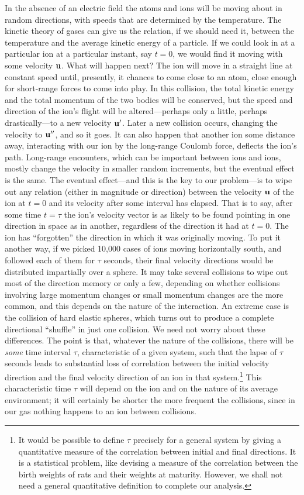 In the absence of an electric field the atoms and ions will be moving
about in random directions, with speeds that are determined by
the temperature. The kinetic theory of gases can give us the relation,
if we should need it, between the temperature and the average
kinetic energy of a particle. If we could look in at a particular ion
at a particular instant, say $t = 0$, we would find it moving with some
velocity $\mathbf{u}$. What will happen next? The ion will move in a straight
line at constant speed until, presently, it chances to come close to an
atom, close enough for short-range forces to come into play. In this
collision, the total kinetic energy and the total momentum of the two
bodies will be conserved, but the speed and direction of the ion's
flight will be altered---perhaps only a little, perhaps drastically---to
a new velocity $\mathbf{u}'$. Later a new collision occurs, changing the velocity
to $\mathbf{u}''$, and so it goes. It can also happen that another ion some distance
away, interacting with our ion by the long-range Coulomb
force, deflects the ion's path. Long-range encounters, which can be
important between ions and ions, mostly change the velocity in
smaller random increments, but the eventual effect is the same.
The eventual effect---and this is the key to our problem---is to wipe
out any relation (either in magnitude or direction) between the
velocity $\mathbf{u}$ of the ion at $t = 0$ and its velocity after some interval has
elapsed. That is to say, after some time $t = \tau$ the ion's velocity vector
is as likely to be found pointing in one direction in space as in
another, regardless of the direction it had at $t = 0$. The ion has
``forgotten'' the direction in which it was originally moving. To put
it another way, if we picked 10,000 cases of ions moving horizontally
south, and followed each of them for $\tau$ seconds, their final velocity
directions would be distributed impartially over a sphere. It may
take several collisions to wipe out most of the direction memory or
only a few, depending on whether collisions involving large momentum
changes or small momentum changes are the more common,
and this depends on the nature of the interaction. An extreme case
is the collision of hard elastic spheres, which turns out to produce a
complete directional ``shuffle'' in just one collision. We need not
worry about these differences. The point is that, whatever the nature
of the collisions, there will be \emph{some} time interval $\tau$, characteristic of
a given system, such that the lapse of $\tau$ seconds leads to substantial
loss of correlation between the initial velocity direction and the final
velocity direction of an ion in that
system.\footnote{It would be possible to define $\tau$ precisely for a general system by giving a quantitative
measure of the correlation between initial and final directions. It is a statistical 
problem, like devising a measure of the correlation between the birth weights of rats and
their weights at maturity. However, we shall not need a general quantitative definition
to complete our analysis.
} This characteristic time
$\tau$ will depend on the ion and on the nature of its average environment;
it will certainly be shorter the more frequent the collisions,
since in our gas nothing happens to an ion between collisions.

